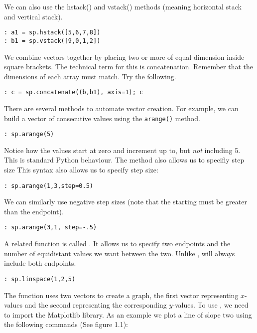 We can also use the hstack() and vstack() methods (meaning horizontal stack and
vertical stack).
\begin{lstlisting}
: a1 = sp.hstack([5,6,7,8])
: b1 = sp.vstack([9,0,1,2])
\end{lstlisting}

We combine vectors together by placing two or more of equal dimension inside
square brackets. The technical term for this is concatenation.  Remember that
the dimensions of each array must match.  Try the following.
\begin{lstlisting}
: c = sp.concatenate((b,b1), axis=1); c
\end{lstlisting}

There are several methods to automate vector creation. For example, we can build
a vector of consecutive values using the \texttt{arange()} method.

\begin{lstlisting}
: sp.arange(5)
\end{lstlisting}

Notice how the values start at zero and increment up to, but \emph{not}
including 5.  This is standard Python behaviour.  The  method
also allows us to specifiy step size
This syntax also allows us to specify step size:

\begin{lstlisting}
: sp.arange(1,3,step=0.5)
\end{lstlisting}

We can similarly use negative step sizes (note that the starting must be greater
than the endpoint).

\begin{lstlisting}
: sp.arange(3,1, step=-.5)
\end{lstlisting}

A related function is called . It allows us to specify two
endpoints and the number of equidistant values we want between the two.  Unlike
,  will always include both endpoints.

\begin{lstlisting}
: sp.linspace(1,2,5)
\end{lstlisting}

The  function uses two vectors to create a graph, the first vector
representing $x$-values and the second representing the corresponding
$y$-values.  To use , we need to import the Matplotlib library.  As
an example we plot a line of slope two using the following commands (See figure
1.1):

